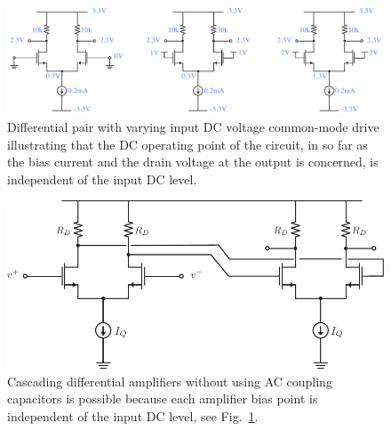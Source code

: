 \begin{figure}[tb]
\begin{center}
\includegraphics[width=\columnwidth]{diff_amp_bias_cm.pdf}
\end{center}
\caption{Differential pair with varying input DC voltage common-mode drive illustrating that the DC operating point of the circuit, in so far as the bias current and the drain voltage at the output is concerned, is independent of the input DC level.}
\label{fig:diff_amp_bias_cm.pdf}
\end{figure}
\begin{figure}[tb]
\begin{center}
\includegraphics[scale=.8]{Diff_Cascade.pdf}
\end{center}
\caption{Cascading differential amplifiers without using AC coupling capacitors is possible because each amplifier bias point is independent of the input DC level, see Fig.~\ref{fig:diff_amp_bias_cm.pdf}.} \label{fig:Diff_Cascade.pdf}
\end{figure}

